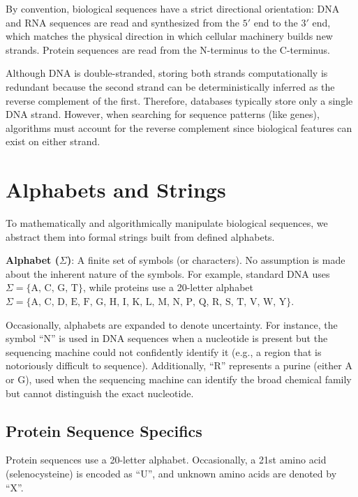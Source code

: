 \sta By convention, biological sequences have a strict directional orientation: DNA and RNA sequences are read and synthesized from the $5'$ end to the $3'$ end, which matches the physical direction in which cellular machinery builds new strands. Protein sequences are read from the N-terminus to the C-terminus.

Although DNA is double-stranded, storing both strands computationally is redundant because the second strand can be deterministically inferred as the reverse complement of the first. Therefore, databases typically store only a single DNA strand. However, when searching for sequence patterns (like genes), algorithms must account for the reverse complement since biological features can exist on either strand.

\section{Alphabets and Strings}

To mathematically and algorithmically manipulate biological sequences, we abstract them into formal strings built from defined alphabets. 

\begin{important}
    \textbf{Alphabet (\(\Sigma\))}: A finite set of symbols (or characters). No assumption is made about the inherent nature of the symbols.
    For example, standard DNA uses \(\Sigma = \{\text{A, C, G, T}\}\), while proteins use a 20-letter alphabet \(\Sigma = \{\text{A, C, D, E, F, G, H, I, K, L, M, N, P, Q, R, S, T, V, W, Y}\}\). 
\end{important}

Occasionally, alphabets are expanded to denote uncertainty. For instance, the symbol ``N'' is used in DNA sequences when a nucleotide is present but the sequencing machine could not confidently identify it (e.g., a region that is notoriously difficult to sequence). Additionally, ``R'' represents a purine (either A or G), used when the sequencing machine can identify the broad chemical family but cannot distinguish the exact nucleotide. 

\subsection{Protein Sequence Specifics}

Protein sequences use a 20-letter alphabet. Occasionally, a 21st amino acid (selenocysteine) is encoded as ``U'', and unknown amino acids are denoted by ``X''. 

